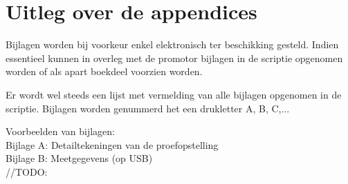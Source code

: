 \chapter{Uitleg over de appendices}
Bijlagen worden bij voorkeur enkel elektronisch ter beschikking gesteld. Indien essentieel kunnen in overleg met de promotor bijlagen in de scriptie opgenomen worden of als apart boekdeel voorzien worden.

Er wordt wel steeds een lijst met vermelding van alle bijlagen opgenomen in de scriptie. Bijlagen worden genummerd het een drukletter A, B, C,...

Voorbeelden van bijlagen:\\
Bijlage A: \qquad	Detailtekeningen van de proefopstelling \\
Bijlage B: \qquad	Meetgegevens (op USB)
\\

//TODO: 




